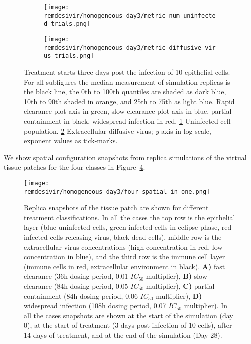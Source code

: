 \begin{figure}[H]
\centering
\begin{subfigure}{0.8\textwidth}
\texttt{[image: remdesivir/homogeneous\_day3/metric\_num\_uninfected\_trials.png]}
\caption{}\label{fig:remdes:res:treat:fine:day3:uninf}
\end{subfigure}
\begin{subfigure}{0.8\textwidth}
\texttt{[image: remdesivir/homogeneous\_day3/metric\_diffusive\_virus\_trials.png]}
\caption{}\label{fig:remdes:res:treat:fine:day3:diff_vir}
\end{subfigure}
\caption{Treatment starts three days post the infection of 10 epithelial cells. For all subfigures the median measurement of simulation replicas is the black line, the 0th to 100th quantiles are shaded as dark blue, 10th to 90th shaded in orange, and 25th to 75th as light blue. Rapid clearance plot axis in green, slow clearance plot axis in blue, partial containment in black, widespread infection in red.
 \ref{fig:remdes:res:treat:fine:day3:uninf} Uninfected cell population. \ref{fig:remdes:res:treat:fine:day3:diff_vir} Extracellular diffusive virus; \emph{y}-axis in log scale, exponent values as tick-marks.}\label{fig:remdes:res:treat:fine:day3}
\end{figure}


We show spatial configuration snapshots from replica simulations of the virtual tissue patches for the four classes in Figure~\ref{fig:remdes:res:treat:fine:spacial_config_classes}.


\begin{figure}[H]
\centering
    \texttt{[image: remdesivir/homogeneous\_day3/four\_spatial\_in\_one.png]} %
    \caption{Replica snapshots of the tissue patch are shown for different treatment classifications. In all the cases the top row is the epithelial layer (blue uninfected cells, green infected cells in eclipse phase, red infected cells releasing virus, black dead cells), middle row is the extracellular virus concentrations (high concentration in red, low concentration in blue), and the third row is the immune cell layer (immune cells in red, extracellular environment in black). \textbf{A)} fast  clearance (36h dosing period, 0.01 $IC_{50}$ multiplier), \textbf{B)} slow clearance (84h dosing period, 0.05 $IC_{50}$ multiplier), \textbf{C)} partial containment (84h dosing period, 0.06 $IC_{50}$ multiplier), \textbf{D)} widespread infection (108h dosing period, 0.07 $IC_{50}$ multiplier). In all the cases snapshots are shown at the start of the simulation (day 0), at the start of treatment (3 days post infection of 10 cells), after 14 days of treatment, and at the end of the simulation (Day 28).}
    \label{fig:remdes:res:treat:fine:spacial_config_classes}
\end{figure}



